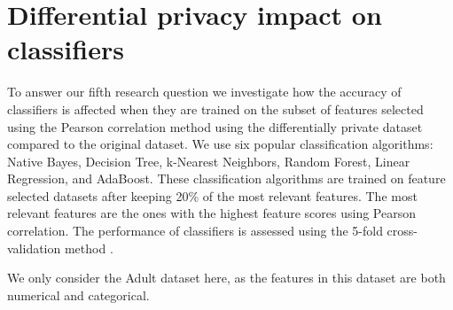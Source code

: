 \section{Differential privacy impact on classifiers}
To answer our fifth research question we investigate how the accuracy of classifiers is affected when they are trained on the subset of features selected using the Pearson correlation method using the differentially private dataset compared to the original dataset. We use six popular classification algorithms: Native Bayes, Decision Tree, k-Nearest Neighbors, Random Forest, Linear Regression, and AdaBoost. These classification algorithms are trained on feature selected datasets after keeping 20\% of the most relevant features. The most relevant features are the ones with the highest feature scores using Pearson correlation. The performance of classifiers is assessed using the 5-fold cross-validation method \cite{crossvalidation}.

We only consider the Adult dataset here, as the features in this dataset are both numerical and categorical.








